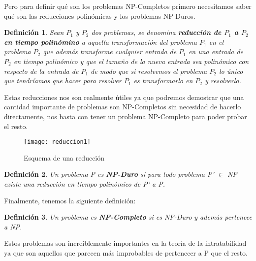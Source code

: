 \documentclass[a4paper,12pt,titlepage]{article}
\newtheorem{defi}{Definici\'on}[section]
\begin{document}
Pero para definir qu\'e son los problemas NP-Completos primero necesitamos
saber qu\'e son las reducciones polin\'omicas y los problemas NP-Duros.

\begin{defi}

Sean $P_{1}$ y $P_{2}$ dos problemas, se denomina \textbf{reducci\'on de $P_{1}$ a $P_{2}$ en tiempo polin\'omino} a aquella transformaci\'on del problema $P_{1}$ en el problema $P_{2}$ que adem\'as transforme cualquier entrada de $P_{1}$ en una entrada de $P_{2}$ en tiempo polin\'omico  y que el tamaño de la nueva entrada sea polin\'omico con respecto de la entrada de $P_1$ de modo que si resolvemos el problema $P_2$ lo \'unico que tendr\'iamos que hacer para resolver $P_1$ es transformarlo en $P_2$ y resolverlo.

\end{defi}

Estas reducciones nos son realmente \'utiles ya que podremos demostrar
que una cantidad importante de problemas son NP-Completos sin necesidad
de hacerlo directamente, nos basta con tener un problema NP-Completo para
poder probar el resto.

\begin{figure}[h]
\centering
\texttt{[image: reduccion1]}
\caption{Esquema de una reducci\'on}
\label{reduccion1}
\end{figure}

\begin{defi}

Un problema P es \textbf{NP-Duro} si para todo problema P' $\in$ NP existe una reducci\'on en tiempo polin\'omico de P' a P.

\end{defi}

Finalmente, tenemos la siguiente definici\'on:

\begin{defi}

Un problema es \textbf{NP-Completo} si es NP-Duro y adem\'as pertenece a NP.

\end{defi}

Estos problemas son increiblemente importantes en la teor\'ia de la intratabilidad ya que son aquellos que parecen m\'as improbables de pertenecer a P que el resto.
\end{document}
